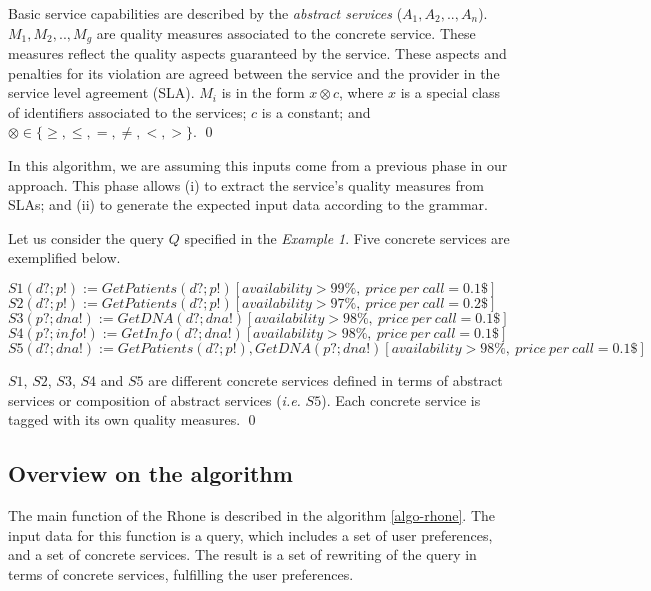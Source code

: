 \begin{definition}
Basic service capabilities are described by the \textit{abstract services} ($A_{1}, A_{2}, .., A_{n}$).
$M_{1},M_{2}, .., M_{g}$ are quality measures associated to the concrete service. 
These measures reflect the quality aspects guaranteed by the service. These aspects and penalties for its violation are agreed between the service and the provider in the service level agreement (SLA).
%
%
$M_{i}$ is in the form $x \otimes c$, where $x$ is a special class of identifiers associated to the services; $c$ is a constant; and $\otimes \in\lbrace \geq, \leq, =, \neq, <, >\rbrace$.
\qed
\end{definition}

In this algorithm, we are assuming this inputs come from a previous phase in our approach.
This phase allows (i) to extract the service's quality measures from SLAs; and (ii) to generate the expected input data according to the grammar.

\begin{example}
%
Let us consider the query $Q$ specified in the \textit{Example 1}. Five concrete services are exemplified below. 
\begin{flushleft}
\small
$S1(d?; p!) := GetPatients(d?; p!)[availability > 99\%, \ price \ per \ call = 0.1\$]$ 
\\
$S2(d?; p!) := GetPatients(d?; p!)[availability > 97\%, \ price \ per \ call = 0.2\$]$
\\
$S3(p?; dna!) := GetDNA(d?; dna!)[availability > 98\%, \ price \ per \ call = 0.1\$]$
\\
$S4(p?; info!) := GetInfo(d?; dna!)[availability > 98\%, \ price \ per \ call = 0.1\$]$
\\
$S5(d?; dna!) := GetPatients(d?; p!), GetDNA(p?; dna!)[availability > 98\%, \ price \ per \ call = 0.1\$]$
\end{flushleft}
$S1$, $S2$, $S3$, $S4$ and $S5$ are different concrete services defined in terms of abstract services or composition of abstract services (\textit{i.e.} $S5$). Each concrete service is tagged with its own quality measures. 
\qed
\end{example}

\subsection{Overview on the algorithm}
The main function of the Rhone is described in the algorithm \ref{algo-rhone}. 
The input data for this function is a query, which includes a set of user preferences, and a set of concrete services. The result is a set of rewriting of the query in terms of concrete services, fulfilling the user preferences.

